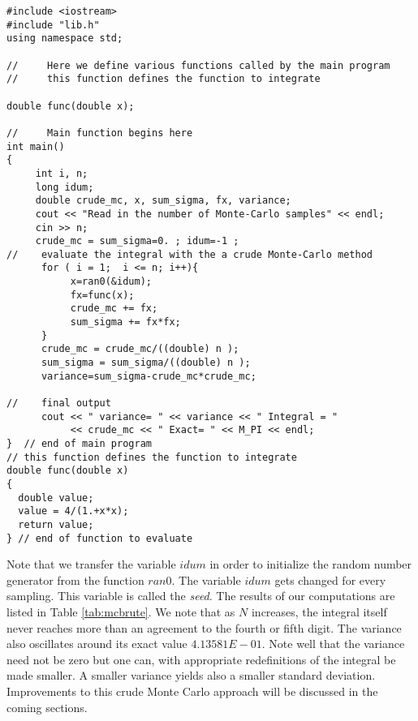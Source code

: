 \begin{lstlisting}[title={\url{http://folk.uio.no/mhjensen/compphys/programs/chapter11/cpp/program1.cpp}}]
#include <iostream>
#include "lib.h"
using namespace std;

//     Here we define various functions called by the main program  
//     this function defines the function to integrate  

double func(double x);

//     Main function begins here     
int main()
{
     int i, n;
     long idum;
     double crude_mc, x, sum_sigma, fx, variance; 
     cout << "Read in the number of Monte-Carlo samples" << endl;
     cin >> n;
     crude_mc = sum_sigma=0. ; idum=-1 ;  
//    evaluate the integral with the a crude Monte-Carlo method    
      for ( i = 1;  i <= n; i++){
           x=ran0(&idum);
           fx=func(x);
           crude_mc += fx;
           sum_sigma += fx*fx;
      }
      crude_mc = crude_mc/((double) n );
      sum_sigma = sum_sigma/((double) n );
      variance=sum_sigma-crude_mc*crude_mc;
      
//    final output 
      cout << " variance= " << variance << " Integral = " 
           << crude_mc << " Exact= " << M_PI << endl;
}  // end of main program 
// this function defines the function to integrate 
double func(double x)
{
  double value;
  value = 4/(1.+x*x);
  return value;
} // end of function to evaluate 
\end{lstlisting}
Note that we transfer the variable $idum$ in order to initialize
the random number generator from the function $ran0$. The variable
$idum$ gets changed for every sampling. This variable is called 
the {\em seed}. 
The results of our computations are listed in Table \ref{tab:mcbrute}.
We note that as $N$ increases, the integral itself never reaches more than an agreement 
to the fourth or fifth digit. The variance also oscillates around its exact value
$4.13581E-01$. Note well that the variance need not be zero but one can, 
with appropriate redefinitions
of the integral be made smaller. A smaller variance yields also a smaller standard deviation. 
Improvements to this crude Monte Carlo
approach will be discussed in the coming sections. 


